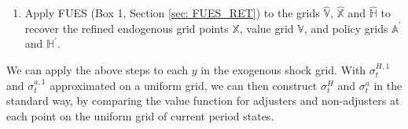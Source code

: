 \documentclass[12pt]{article}
\begin{document}
\begin{tcolorbox}[
colframe=black!100,
colback=white!10,
coltitle=white!100!black,  
fonttitle=\bfseries,
adjusted title= Box 2: FUES and EGM for adjuster policy function]
\begin{enumerate}
\begin{enumerate}[label=(\roman*)]
\begin{equation*}
    \end{equation*}
    \item Append the $P$ multiple roots $(\hat{a}^{\prime,0}, \dots, \hat{a}^{\prime,p}, \dots \hat{a}^{\prime,P})$ to $\mathbb{\hat{A}}^{\prime}$, the time $t$ values to $\mathbb{\hat{V}}$, the endogenous grid points to $\mathbb{\hat{X}}$, and $P$ copies of $\hat{h}_{i}$ to $\mathbb{\hat{H}}^{\prime}$. 
    \end{enumerate}
    \item Apply FUES (Box 1, Section \ref{sec: FUES_RET}) to the grids  $\mathbb{\hat{V}}$, $\mathbb{\hat{X}}$  and $\mathbb{\hat{H}}$ to recover the refined endogenous grid points $\mathbb{X}$, value grid $\mathbb{V}$, and policy grids $\mathbb{A}^{\prime}$ and $\mathbb{H}^{\prime}$.
\end{enumerate}
\end{tcolorbox}
                
We can apply the above steps to each $y$ in the exogenous shock grid.  With $\sigma_{t}^{H,1}$ and $\sigma_{t}^{a,1}$ approximated on a uniform grid, we can then construct $\sigma_{t}^{H}$ and $\sigma_{t}^{a}$ in the standard way, by comparing the value function for adjusters and non-adjusters at each point on the uniform grid of current period states. 
\end{document}
